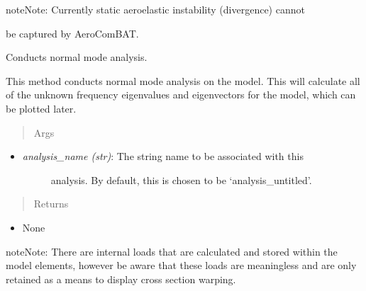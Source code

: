 \documentclass[letterpaper,10pt,english]{sphinxmanual}
\begin{document}
\begin{fulllineitems}
\begin{fulllineitems}
\begin{itemize}
\end{itemize}

\begin{notice}{note}{Note:}
Currently static aeroelastic instability (divergence) cannot
\end{notice}

be captured by AeroComBAT.

\end{fulllineitems}


\begin{fulllineitems}
\label{FEM:AeroComBAT.FEM.Model.normalModesAnalysis}
Conducts normal mode analysis.

This method conducts normal mode analysis on the model. This will
calculate all of the unknown frequency eigenvalues and eigenvectors for
the model, which can be plotted later.
\begin{quote}\begin{description}
\item[{Args}] \leavevmode
\end{description}\end{quote}
\begin{itemize}
\item {} \begin{description}
\item[{\emph{analysis\_name (str)}: The string name to be associated with this}] \leavevmode
analysis. By default, this is chosen to be `analysis\_untitled'.

\end{description}

\end{itemize}
\begin{quote}\begin{description}
\item[{Returns}] \leavevmode
\end{description}\end{quote}
\begin{itemize}
\item {} 
None

\end{itemize}

\begin{notice}{note}{Note:}
There are internal loads that are calculated and stored
within the model elements, however be aware that these loads are
meaningless and are only retained as a means to display cross
section warping.
\end{notice}


\end{fulllineitems}
\end{fulllineitems}
\end{document}
